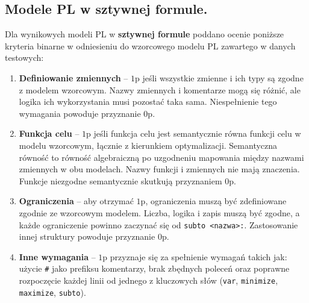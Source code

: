 

\subsection{Modele PL w sztywnej formule.}

Dla wynikowych modeli PL w \textbf{sztywnej formule} poddano ocenie poniższe kryteria binarne w odniesieniu do wzorcowego modelu PL zawartego w danych testowych:

\begin{enumerate}
\item \textbf{Definiowanie zmiennych} -- $1$p jeśli wszystkie zmienne i ich typy są zgodne z modelem wzorcowym. Nazwy zmiennych i komentarze mogą się różnić, ale logika ich wykorzystania musi pozostać taka sama. Niespełnienie tego wymagania powoduje przyznanie $0$p. %
\item \textbf{Funkcja celu} -- $1$p jeśli funkcja celu jest semantycznie równa funkcji celu w modelu wzorcowym, łącznie z kierunkiem optymalizacji. Semantyczna równość to równość algebraiczną po uzgodneniu mapowania między nazwami zmiennych w obu modelach. Nazwy funkcji i zmiennych nie mają znaczenia. Funkcje niezgodne semantycznie skutkują przyznaniem $0$p.
\item \textbf{Ograniczenia} -- aby otrzymać $1$p, ograniczenia muszą być zdefiniowane zgodnie ze wzorcowym modelem. Liczba, logika i zapis muszą być zgodne, a każde ograniczenie powinno zaczynać się od \texttt{subto <nazwa>:}. Zastosowanie innej struktury powoduje przyznanie $0$p.
\item \textbf{Inne wymagania} -- $1$p przyznaje się za spełnienie wymagań takich jak: użycie \texttt{\#} jako prefiksu komentarzy, brak zbędnych poleceń oraz poprawne rozpoczęcie każdej linii od jednego z kluczowych słów (\texttt{var}, \texttt{minimize}, \texttt{maximize}, \texttt{subto}). %
\end{enumerate}

